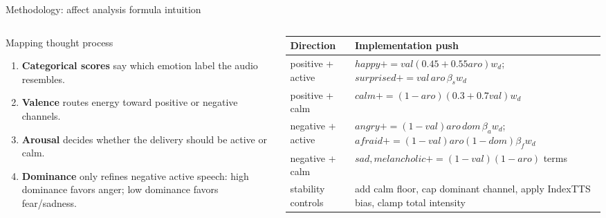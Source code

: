 \documentclass[aspectratio=169,10pt]{beamer}
\begin{document}
\begin{frame}{Methodology: affect analysis formula intuition}
\begin{columns}[T,totalwidth=\textwidth]
\begin{block}{Mapping thought process}
{\fontsize{6.15}{6.75}\selectfont
\begin{enumerate}
  \item \textbf{Categorical scores} say which emotion label the audio resembles.
  \item \textbf{Valence} routes energy toward positive or negative channels.
  \item \textbf{Arousal} decides whether the delivery should be active or calm.
  \item \textbf{Dominance} only refines negative active speech: high dominance favors anger; low dominance favors fear/sadness.
\end{enumerate}
}
\end{block}
\vspace{0.1em}
{\fontsize{5.65}{6.25}\selectfont
\begin{tabularx}{\linewidth}{p{2.0cm}Y}
\toprule
Direction & Implementation push \\
\midrule
positive + active & \(happy += val(0.45+0.55aro)w_d\); \(surprised += val\,aro\,\beta_s w_d\) \\
positive + calm & \(calm += (1-aro)(0.3+0.7val)w_d\) \\
negative + active & \(angry += (1-val)aro\,dom\,\beta_a w_d\); \(afraid += (1-val)aro(1-dom)\beta_f w_d\) \\
negative + calm & \(sad, melancholic += (1-val)(1-aro)\) terms \\
stability controls & add calm floor, cap dominant channel, apply IndexTTS bias, clamp total intensity \\
\bottomrule
\end{tabularx}
}
\end{columns}
\end{frame}
\end{document}
